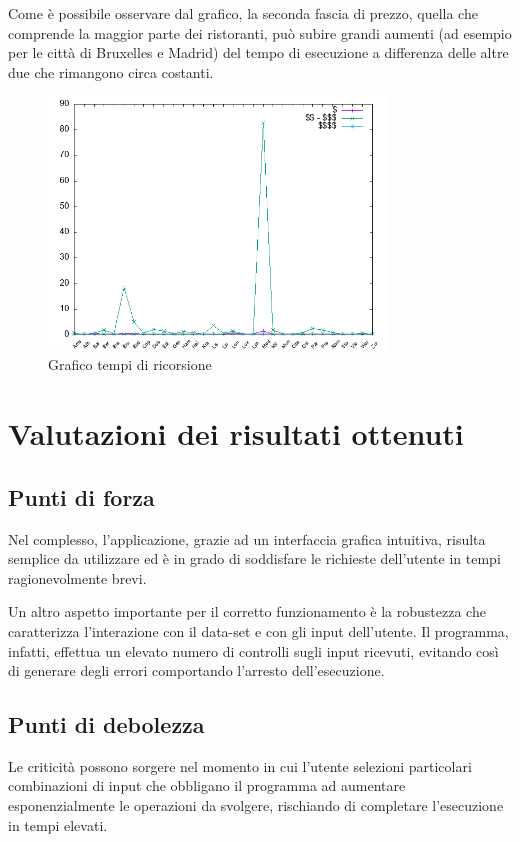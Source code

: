 \documentclass{report}
\begin{document}
Come è possibile osservare dal grafico, la seconda fascia di prezzo, quella che comprende la maggior parte dei ristoranti, può subire grandi aumenti (ad esempio per le città di Bruxelles e Madrid) del tempo di esecuzione a differenza delle altre due che rimangono circa costanti.
\begin{figure}[h]
    \centering
    \includegraphics[width=0.8\textwidth]{images/graficoTempiRicorsione.png}
    \caption{Grafico tempi di ricorsione}
\end{figure}

\chapter{Valutazioni dei risultati ottenuti}\label{cap_valutazioni}

\section{Punti di forza}
Nel complesso, l'applicazione, grazie ad un interfaccia grafica intuitiva, risulta semplice da utilizzare ed è in grado di soddisfare le richieste dell'utente in tempi ragionevolmente brevi.

Un altro aspetto importante per il corretto funzionamento è la robustezza che caratterizza l'interazione con il data-set e con gli input dell'utente. Il programma, infatti, effettua un elevato numero di controlli sugli input ricevuti, evitando così di generare degli errori comportando l'arresto dell'esecuzione.

\section{Punti di debolezza}
Le criticità possono sorgere nel momento in cui l'utente selezioni particolari combinazioni di input che obbligano il programma ad aumentare esponenzialmente le operazioni da svolgere, rischiando di completare l'esecuzione in tempi elevati.
\end{document}
